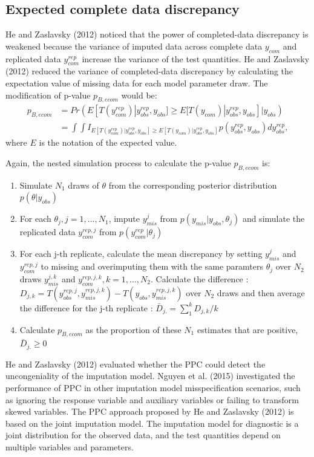 \documentclass[12pt, fullpage, a4paper]{article}
\begin{document}
\subsection{Expected complete data discrepancy}
He and Zaslavsky (2012) noticed that the power of completed-data discrepancy is weakened because the variance of imputed data across complete data $y_{com}$ and replicated data $y_{com}^{rep}$ increase the variance of the test quantities. He and Zaslavsky (2012) reduced the variance of completed-data discrepancy by calculating the expectation value of missing data for each model parameter draw. 
The modification of p-value $p_{B, ecom}$ would be:  
\begin{equation}
	\begin{array}{ll}
		p_{B, ecom} &= Pr(E[T(y_{com}^{rep})|y_{obs}^{rep}, y_{obs}] \ge E[T(y_{com})|y_{obs}^{rep}, y_{obs}]|y_{obs})\\
		&= \int\int I_{E[T(y_{com}^{rep})|y_{obs}^{rep}, y_{obs}] \ge E[T(y_{com})|y_{obs}^{rep}, y_{obs}]}p(y_{obs}^{rep}, y_{obs})dy_{obs}^{rep}, 
	\end{array} 
\end{equation}
where $E$ is the notation of the expected value. 

Again, the nested simulation process to calculate the p-value $p_{B, ecom}$ is:
\begin{enumerate}
	\item Simulate $N_{1}$ draws of $\theta$ from the corresponding posterior distribution $p(\theta|y_{obs})$
	\item For each $\theta_{j}, j=1, \dots, N_{1}$, impute $y_{mis}^j$ from $p(y_{mis}|y_{obs}, \theta_{j})$ and simulate the replicated data $y_{com}^{rep, j}$ from $p(y_{com}^{rep}|\theta_{j})$
	\item For each j-th replicate, calculate the mean discrepancy by setting $y_{mis}^j$ and $y_{com}^{rep, j}$ to missing and overimputing them with the same paramters $\theta_{j}$ over $N_{2}$ draws $y_{mis}^{j, k}$ and $y_{com}^{rep, j, k}, k = 1, \dots, N_{2}$. Calculate the difference : $D_{j, k} = T(y_{obs}^{rep, j}, y_{mis}^{rep, j, k}) - T(y_{obs}, y_{mis}^{rep, j, k})$ over $N_{2}$ draws and then average the difference for the j-th replicate : $\bar{D}_{j.} = \sum_{1}^{k}D_{j, k}/k$
	\item Calculate $p_{B, ecom}$ as the proportion of these $N_{1}$ estimates that are positive, $\bar{D}_{j.} \ge 0$    
\end{enumerate}

He and Zaslavsky (2012) evaluated whether the PPC could detect the uncongeniality of the imputation model. Nguyen et al. (2015) investigated the performance of PPC in other imputation model misspecification scenarios, such as ignoring the response variable and auxiliary variables or failing to transform skewed variables. The PPC approach proposed by He and Zaslavsky (2012) is based on the joint imputation model. The imputation model for diagnostic is a joint distribution for the observed data, and the test quantities depend on multiple variables and parameters. 
\end{document}
